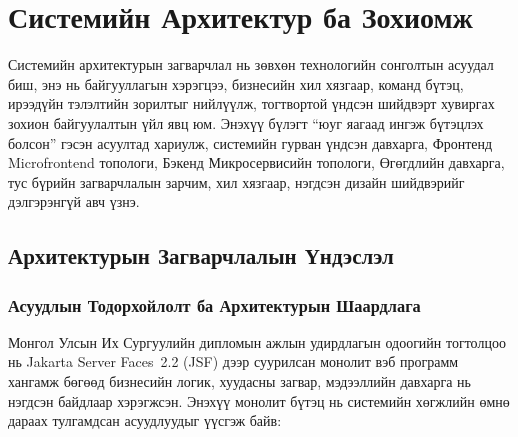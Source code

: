 
\chapter{Системийн Архитектур ба Зохиомж}

Системийн архитектурын загварчлал нь зөвхөн технологийн сонголтын асуудал
биш, энэ нь байгууллагын хэрэгцээ, бизнесийн хил хязгаар, команд
бүтэц, ирээдүйн тэлэлтийн зорилтыг нийлүүлж, тогтвортой үндсэн шийдвэрт
хувиргах зохион байгуулалтын үйл явц юм. Энэхүү бүлэгт ``юуг яагаад
ингэж бүтэцлэх болсон'' гэсэн асуултад хариулж, системийн гурван үндсэн
давхарга, Фронтенд Microfrontend топологи, Бэкенд Микросервисийн
топологи, Өгөгдлийн давхарга, тус бүрийн загварчлалын зарчим, хил
хязгаар, нэгдсэн дизайн шийдвэрийг дэлгэрэнгүй авч үзнэ.

\section{Архитектурын Загварчлалын Үндэслэл}

\subsection{Асуудлын Тодорхойлолт ба Архитектурын Шаардлага}

Монгол Улсын Их Сургуулийн дипломын ажлын удирдлагын одоогийн тогтолцоо
нь Jakarta Server Faces~2.2 (JSF) дээр суурилсан монолит вэб
программ хангамж бөгөөд бизнесийн логик, хуудасны загвар, мэдээллийн
давхарга нь нэгдсэн байдлаар хэрэгжсэн. Энэхүү монолит бүтэц нь системийн
хөгжлийн өмнө дараах тулгамдсан асуудлуудыг үүсгэж байв:

